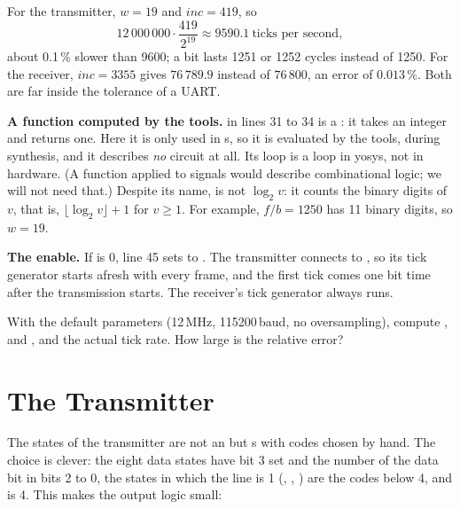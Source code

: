 
For the transmitter, $w = 19$ and $\mathit{inc} = 419$, so
\[
  12\,000\,000 \cdot \frac{419}{2^{19}} \approx 9590.1\ \text{ticks per second},
\]
about 0.1\,\% slower than 9600; a bit lasts 1251 or 1252 cycles instead of 1250.
For the receiver, $\mathit{inc} = 3355$ gives $76\,789.9$ instead of $76\,800$,
an error of $0.013\,\%$. Both are far inside the tolerance of a UART.

\textbf{A function computed by the tools.}  in lines 31 to 34 is a
: it takes an integer and returns one. Here it is only used in
s, so it is evaluated by the tools, during synthesis, and it
describes \emph{no} circuit at all. Its  loop is a loop in yosys,
not in hardware. (A function applied to signals would describe combinational
logic; we will not need that.) Despite its name,  is not
$\log_2 v$: it counts the binary digits of $v$, that is, $\lfloor \log_2 v
\rfloor + 1$ for $v \ge 1$. For example, $f/b = 1250$ has 11 binary digits,
so $w = 19$.

\textbf{The enable.} If  is 0, line 45 sets  to .
The transmitter connects  to , so its tick generator
starts afresh with every frame, and the first tick comes one bit time after
the transmission starts. The receiver's tick generator always runs.

\begin{exercise}
\label{ex:step06-baud}
With the default parameters (12\,MHz, 115200\,baud, no oversampling), compute
,  and , and the actual tick rate. How
large is the relative error?
\end{exercise}

\section{The Transmitter}
\label{sec:step06-tx}


The states of the transmitter are not an  but s with
codes chosen by hand. The choice is clever: the eight data states have bit 3
set and the number of the data bit in bits 2 to 0, the states in which the
line is 1 (, , ) are the codes below 4,
and  is 4. This makes the output logic small:

